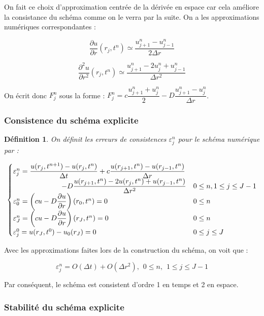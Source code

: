 \documentclass[a4paper,fleqn,leqno]{article}
\newtheorem*{definition}{Définition}
\begin{document}
On fait ce choix d'approximation centrée de la dérivée en espace car cela améliore la consistance du schéma comme on le verra par la suite.
On a les approximations numériques correspondantes :

$$\dfrac{\partial u}{\partial r}(r_j,t^n) \simeq \dfrac{u_{j+1}^n-u_{j-1}^n}{2\Delta r}$$

$$\dfrac{\partial^2 u}{\partial r^2}(r_j,t^n) \simeq \dfrac{u^n_{j+1}-2u^n_j+u^n_{j-1}}{\Delta r^2}$$

On écrit donc $F^n_j$ sous la forme : $F^n_j = c\dfrac{u^n_{j+1} + u^n_j}{2} - D\dfrac{u^n_{j+1} - u^n_j}{\Delta r}$.

\subsubsection{Consistence du schéma explicite}

\begin{definition}
On définit les erreurs de consistences $\varepsilon^n_j$ pour le schéma numérique par :

\begin{equation*}
\begin{cases}
\varepsilon^n_j = \dfrac{u(r_j,t^{n+1}) - u(r_j,t^n)}{\Delta t} +c\dfrac{u(r_{j+1},t^n)-u(r_{j-1},t^n)}{\Delta r} \\ \hspace{2.4cm}-D\dfrac{u(r_{j+1},t^n)-2u(r_j,t^n) + u(r_{j-1},t^n)}{\Delta r^2} 
& 0\leq n, 1\leq j\leq J-1 \\
\varepsilon^n_0 = \left(cu-D\dfrac{\partial u}{\partial r}\right)(r_0,t^n)=0 & 0\leq n \\
\varepsilon^n_J = \left(cu-D\dfrac{\partial u}{\partial r}\right)(r_J,t^n)=0 & 0\leq n \\
\varepsilon^0_j = u(r_J,t^0) - u_0(r_J) = 0 & 0\leq j\leq J \\
\end{cases}
\end{equation*}
\end{definition}


Avec les approximations faites lors de la construction du schéma, on voit que :

$$\varepsilon^n_j = O(\Delta t) + O(\Delta r^2), \hspace{5pt} 0\leq n, \hspace{5pt} 1\leq j\leq J-1$$

Par conséquent, le schéma est consistent d'ordre 1 en temps et 2 en espace.


\subsubsection{Stabilité du schéma explicite}
\end{document}
